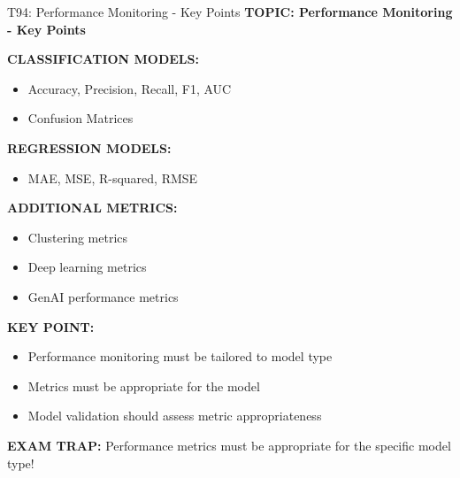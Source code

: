 \documentclass[8pt]{beamer}
\begin{document}
	\begin{frame}{T94: Performance Monitoring - Key Points}
		\fontsize{6.5}{7.5}\selectfont
		\textbf{TOPIC: Performance Monitoring - Key Points}
		
		\vspace{0.1cm}
		\textbf{CLASSIFICATION MODELS:}
		\begin{itemize}
			\item Accuracy, Precision, Recall, F1, AUC
			\item Confusion Matrices
		\end{itemize}
		
		\vspace{0.1cm}
		\textbf{REGRESSION MODELS:}
		\begin{itemize}
			\item MAE, MSE, R-squared, RMSE
		\end{itemize}
		
		\vspace{0.1cm}
		\textbf{ADDITIONAL METRICS:}
		\begin{itemize}
			\item Clustering metrics
			\item Deep learning metrics
			\item GenAI performance metrics
		\end{itemize}
		
		\vspace{0.1cm}
		\textbf{KEY POINT:}
		\begin{itemize}
			\item Performance monitoring must be tailored to model type
			\item Metrics must be appropriate for the model
			\item Model validation should assess metric appropriateness
		\end{itemize}
		
		\textcolor{myred}{\textbf{EXAM TRAP:}} Performance metrics must be \textcolor{myblue}{appropriate for the specific model type}!
	\end{frame}
	
\end{document}
